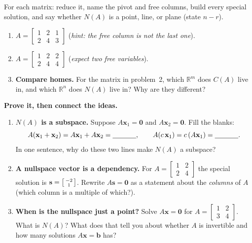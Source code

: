 \documentclass[10pt]{article}
\newcommand{\xx}{\mathbf{x}}
\newcommand{\bb}{\mathbf{b}}
\newcommand{\svec}{\mathbf{s}}
\newcommand{\zero}{\mathbf{0}}
\begin{document}
\begin{tcolorbox}[colback=white, colframe=black!40, title=\textbf{Tier A --- Approaching Proficiency},
    fonttitle=\bfseries, arc=1.5mm, left=3mm, right=3mm, top=2mm, bottom=2mm, breakable]
For each matrix: reduce it, name the pivot and free columns, build every special solution, and say
whether $N(A)$ is a point, line, or plane (state $n-r$).
\begin{enumerate}[leftmargin=1.7em, itemsep=9pt]
  \item $A=\begin{bmatrix} 1 & 2 & 1 \\ 2 & 4 & 3 \end{bmatrix}$ \quad (\emph{hint: the free column is not the last one}). 
  \item $A=\begin{bmatrix} 1 & 2 & 2 \\ 2 & 4 & 4 \end{bmatrix}$ \quad (\emph{expect two free variables}). 
  \item \textbf{Compare homes.} For the matrix in problem~2, which $\mathbb{R}^m$ does $C(A)$ live in, and
        which $\mathbb{R}^n$ does $N(A)$ live in? Why are they different? 
\end{enumerate}
\end{tcolorbox}

\begin{tcolorbox}[colback=white, colframe=black!40, title=\textbf{Tier E --- Extension},
    fonttitle=\bfseries, arc=1.5mm, left=3mm, right=3mm, top=2mm, bottom=2mm, breakable]
\textbf{Prove it, then connect the ideas.}
\begin{enumerate}[leftmargin=1.7em, itemsep=9pt]
  \item \textbf{$N(A)$ is a subspace.} Suppose $A\xx_1=\zero$ and $A\xx_2=\zero$. Fill the blanks:
        \[ A(\xx_1+\xx_2)=A\xx_1+A\xx_2=\blank{1.2cm}, \qquad A(c\,\xx_1)=c\,(A\xx_1)=\blank{1.2cm}. \]
        In one sentence, why do these two lines make $N(A)$ a subspace? 
  \item \textbf{A nullspace vector is a dependency.} For $A=\begin{bmatrix} 1 & 2 \\ 2 & 4 \end{bmatrix}$
        the special solution is $\svec=\begin{bsmallmatrix} -2\\1 \end{bsmallmatrix}$. Rewrite $A\svec=\zero$ as
        a statement about the \emph{columns} of $A$ (which column is a multiple of which?). 
  \item \textbf{When is the nullspace just a point?} Solve $A\xx=\zero$ for $A=\begin{bmatrix} 1 & 2 \\ 3 & 4 \end{bmatrix}$.
        What is $N(A)$? What does that tell you about whether $A$ is invertible and how many solutions
        $A\xx=\bb$ has? 
\end{enumerate}
\end{tcolorbox}
\end{document}
